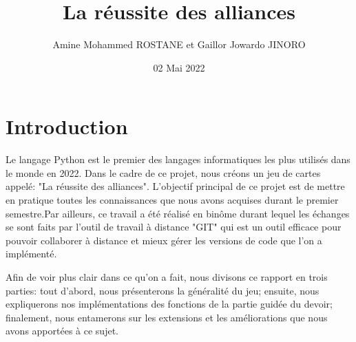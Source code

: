 \documentclass{article}
\title{La réussite des alliances}
\author{Amine Mohammed ROSTANE et Gaillor Jowardo JINORO}
\date{02 Mai 2022}
\begin{document}
\maketitle
\tableofcontents

\section{Introduction}

\hspace{\parindent} Le langage Python est le premier des langages informatiques les plus utilisés dans le monde en 2022. Dans le cadre de ce projet, nous créons un jeu de cartes appelé: "La réussite des alliances". L'objectif principal de ce projet est de mettre en pratique toutes les connaissances que nous avons acquises durant le premier semestre.Par ailleurs, ce travail a été réalisé en binôme durant lequel les échanges se sont faits par l'outil de travail à distance "GIT" qui  est un outil efficace pour pouvoir collaborer à distance et mieux gérer les versions de code que l'on a implémenté.
\par Afin de voir plus clair dans ce qu'on a fait, nous divisons ce rapport en trois parties: tout d'abord, nous présenterons la généralité du jeu; ensuite, nous expliquerons nos implémentations des fonctions de la partie guidée du devoir; finalement, nous entamerons sur les extensions et les améliorations que nous avons apportées à ce sujet.




	





\end{document}
